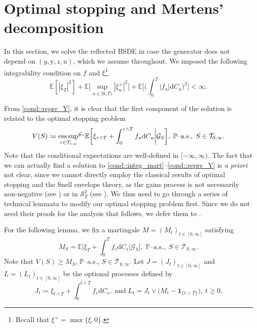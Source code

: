 \documentclass[10pt]{article} %
\newcommand\cG{\mathcal G}
\newcommand\cS{\mathcal S}
\newcommand\cT{\mathcal T}
\newcommand{\smalltext}[1]{\text{\fontsize{4}{4}\selectfont$#1$}}
\def \E{\mathbb{E}}
\def \P{\mathbb{P}}
\def\d{\mathrm{d}}
\DeclareMathOperator*{\esssup}{ess\,sup}
\begin{document}
\section{Optimal stopping and Mertens' decomposition}\label{sec::optimal_stopping}

In this section, we solve the reflected BSDE in case the generator does not depend on $(y,\mathrm{y},z,u)$, which we assume throughout. We imposed the following integrability condition on $f$ and $\xi$\footnote{Recall that $\xi^+ = \max\{\xi,0\}$.}
\begin{equation}\label{eq::integrability_optimal_stopping}
	\E[|\xi_T|^2] + \E\bigg[\sup_{u \in [0,T)}|\xi^+_u|^2\bigg] + \E\Bigg[\bigg(\int_0^T|f_u|\d C_u \bigg)^2\Bigg] < \infty.
\end{equation}

 From \ref{cond::repre_Y}, it is clear that the first component of the solution is related to the optimal stopping problem
\begin{equation}\label{eq::optimal_stopping}
	V(S) \coloneqq {\esssup_{\tau \in \cT_{\smalltext{S}\smalltext{,}\smalltext{\infty}}}}^{\cG_\smalltext{S}} \E \bigg[ \xi_{\tau \land T} + \int_0^{\tau \land T} f_u \d C_u \bigg| \cG_S \bigg], \; \text{$\P$--a.s.}, \; S \in \cT_{0,\infty}.
\end{equation}
Note that the conditional expectations are well-defined in $[-\infty,\infty)$. The fact that we can actually find a solution to \ref{cond::integ_mart}--\ref{cond::repre_Y} is \emph{a priori} not clear, since we cannot directly employ the classical results of optimal stopping and the Snell envelope theory, as the gains process is not necessarily non-negative (see \cite{el1981aspects,maingueneau1978temps}) or in $\cS^2_T$ (see \cite{grigorova2017reflected,grigorova2020optimal}). We thus need to go through a series of technical lemmata to modify our optimal stopping problem first. Since we do not need their proofs for the analysis that follows, we defer them to .

\medskip
For the following lemma, we fix a martingale $M= (M_t)_{t \in [0,\infty]}$ satisfying
	\begin{equation*}
		M_S = \E\bigg[\xi_T + \int_0^T f_s \d C_s\bigg|\cG_S\bigg], \; \text{$\P$--a.s.}, \; S \in \cT_{0,\infty}.
	\end{equation*}
	Note that $V(S) \geq M_S$, $\P$--a.s., $S \in \cT_{0,\infty}$. Let $J = (J_t)_{t \in [0,\infty]}$ and $L = (L_t)_{t \in [0,\infty]}$ be the optional processes defined by
	\begin{equation*}
		J_t \coloneqq \xi_{t \land T} + \int_0^{t \land T} f_s \d C_s, \; \text{and} \; L_t = J_t \lor \big(M_t - \mathbf{1}_{\{t < T\}}\big),\ t\geq 0.
	\end{equation*}
\end{document}
